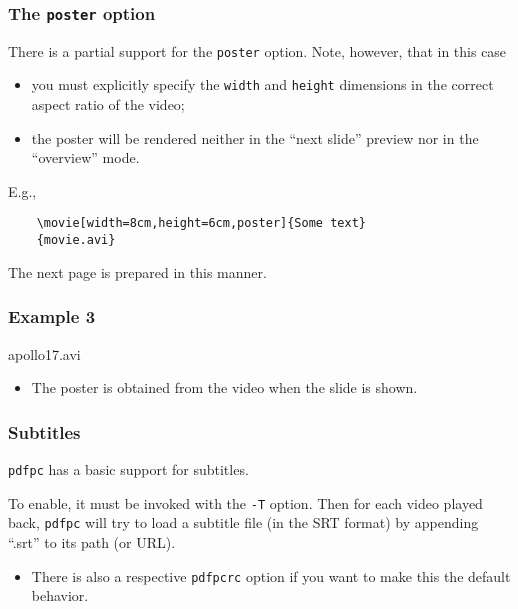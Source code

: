 \documentclass{beamer}
\newcommand{\singleitem}[1]{\begin{itemize}\item #1\end{itemize}}
\newcommand{\pdfpc}{\texttt{pdfpc}\xspace}
\newcommand{\opt}[1]{\texttt{#1}\xspace}
\begin{document}
\begin{frame}[fragile]
  \frametitle{The \opt{poster} option}
  \hypertarget{posterPage}{}
  There is a partial support for the \opt{poster} option. Note, however, that in
  this case
  \begin{itemize}
    \item you must explicitly specify the \opt{width} and \opt{height}
          dimensions in the correct aspect ratio of the video;
    \item the poster will be rendered neither in the ``next slide''
          preview nor in the ``overview'' mode.
  \end{itemize}

  \vspace{10pt}

  E.g.,
  \begin{lstlisting}
    \movie[width=8cm,height=6cm,poster]{Some text}
    {movie.avi}
  \end{lstlisting}

  \vfill
  The next page is prepared in this manner.

\end{frame}

\begin{frame}
  \frametitle{Example 3}

  \vspace{10pt}
  \begin{center}
        {apollo17.avi}
  \end{center}

  \vfill
  \singleitem{The poster is obtained from the video when the slide is shown.}
\end{frame}


\begin{frame}
  \frametitle{Subtitles}

  \pdfpc has a basic support for subtitles. 
  
  \vspace{10pt}

  To enable, it must be invoked with the \opt{-T} option. Then for each video
  played back, \pdfpc will try to load a subtitle file (in the SRT format) by
  appending ``.srt'' to its path (or URL).
  
  \singleitem{There is also a respective \opt{pdfpcrc} option if you want to
    make this the default behavior.}
\end{frame}
\end{document}

